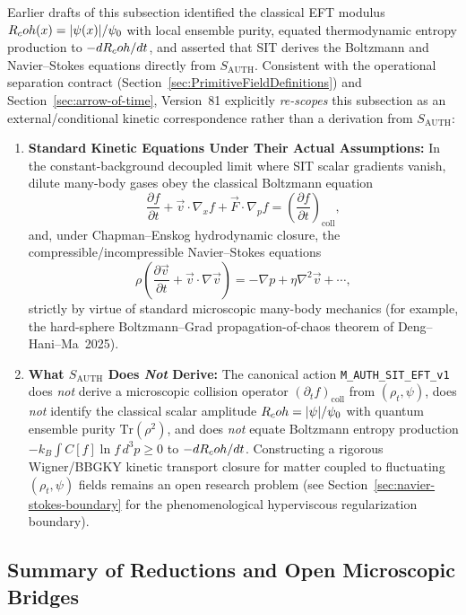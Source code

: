 Earlier drafts of this subsection identified the classical EFT modulus $R_coh(x) = |\psi(x)|/\psi_0$ with local ensemble purity, equated thermodynamic entropy production to $-dR_coh/dt$, and asserted that SIT derives the Boltzmann and Navier--Stokes equations directly from $S_{\mathrm{AUTH}}$. Consistent with the operational separation contract (Section~\ref{sec:PrimitiveFieldDefinitions}) and Section~\ref{sec:arrow-of-time}, Version~81 explicitly \emph{re-scopes} this subsection as an external/conditional kinetic correspondence rather than a derivation from $S_{\mathrm{AUTH}}$:
\begin{enumerate}[leftmargin=2em]
  \item \textbf{Standard Kinetic Equations Under Their Actual Assumptions:} In the constant-background decoupled limit where SIT scalar gradients vanish, dilute many-body gases obey the classical Boltzmann equation
  \[
  \frac{\partial f}{\partial t} + \vec{v} \cdot \nabla_x f + \vec{F} \cdot \nabla_p f = \left( \frac{\partial f}{\partial t} \right)_{\mathrm{coll}},
  \]
  and, under Chapman--Enskog hydrodynamic closure, the compressible/incompressible Navier--Stokes equations
  \[
  \rho \left( \frac{\partial \vec{v}}{\partial t} + \vec{v} \cdot \nabla \vec{v} \right)
  = -\nabla p + \eta \nabla^2 \vec{v} + \cdots,
  \]
  strictly by virtue of standard microscopic many-body mechanics (for example, the hard-sphere Boltzmann--Grad propagation-of-chaos theorem of Deng--Hani--Ma~2025).
  \item \textbf{What $S_{\mathrm{AUTH}}$ Does \emph{Not} Derive:} The canonical action \texttt{M\_AUTH\_SIT\_EFT\_v1} does \emph{not} derive a microscopic collision operator $(\partial_t f)_{\mathrm{coll}}$ from $(\rho_t, \psi)$, does \emph{not} identify the classical scalar amplitude $R_coh = |\psi|/\psi_0$ with quantum ensemble purity $\mathrm{Tr}(\rho^2)$, and does \emph{not} equate Boltzmann entropy production $-k_B\int C[f]\ln f\,d^3p \ge 0$ to $-dR_coh/dt$. Constructing a rigorous Wigner/BBGKY kinetic transport closure for matter coupled to fluctuating $(\rho_t, \psi)$ fields remains an open research problem (see Section~\ref{sec:navier-stokes-boundary} for the phenomenological hyperviscous regularization boundary).
\end{enumerate}

\subsection*{Summary of Reductions and Open Microscopic Bridges}


